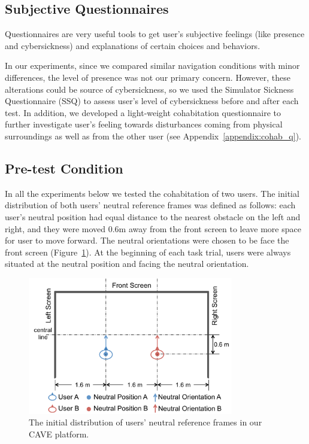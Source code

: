 \subsection{Subjective Questionnaires}
Questionnaires are very useful tools to get user's subjective feelings (like presence and cybersickness) and explanations of certain choices and behaviors.

In our experiments, since we compared similar navigation conditions with minor differences, the level of presence was not our primary concern. However, these alterations could be source of cybersickness, so we used the Simulator Sickness Questionnaire (SSQ) \cite{Kennedy1993SSQ} to assess user's level of cybersickness before and after each test. In addition, we developed a light-weight cohabitation questionnaire to further investigate user's feeling towards disturbances coming from physical surroundings as well as from the other user (see Appendix~\ref{appendix:cohab_q}).

\subsection{Pre-test Condition}
In all the experiments below we tested the cohabitation of two users. The initial distribution of both users' neutral reference frames was defined as follows: each user's neutral position had equal distance to the nearest obstacle on the left and right, and they were moved 0.6m away from the front screen to leave more space for user to move forward. The neutral orientations were chosen to be face the front screen (Figure~\ref{fig:4_initial_config}). At the beginning of each task trial, users were always situated at the neutral position and facing the neutral orientation.

\begin{figure}[tb]
  \centering
  \includegraphics[width=0.8\textwidth]{figures/ch4/initial_config}
  \caption{\label{fig:4_initial_config}The initial distribution of users' neutral reference frames in our CAVE platform.}
\end{figure}

